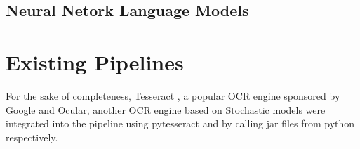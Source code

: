 \subsection{Neural Netork Language Models}


\section{Existing Pipelines}

For the sake of completeness, Tesseract \cite{SmithTesseract}, a popular OCR engine sponsored by Google \cite{Vincent} and Ocular, another OCR engine based on Stochastic models were integrated into the pipeline using pytesseract \cite{Lee} and by calling jar files from python respectively.
